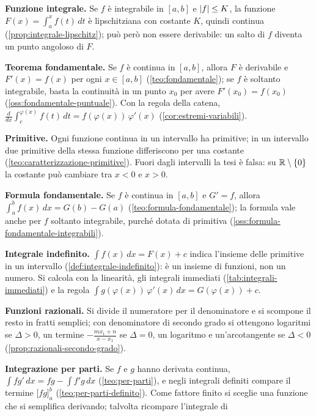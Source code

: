 \begin{puntichiave}
\item \textbf{Funzione integrale.} Se $f$ è integrabile in $[a,b]$ e $\lvert f\rvert\le K$, la
funzione $F(x)=\int_{a}^{x}f(t)\,dt$ è lipschitziana con costante $K$, quindi continua
(\cref{prop:integrale-lipschitz}); può però non essere derivabile: un salto di $f$
diventa un punto angoloso di $F$.
\item \textbf{Teorema fondamentale.} Se $f$ è continua in $[a,b]$, allora $F$ è
derivabile e $F'(x)=f(x)$ per ogni $x\in[a,b]$ (\cref{teo:fondamentale}); se $f$ è soltanto
integrabile, basta la continuità in un punto $x_{0}$ per avere $F'(x_{0})=f(x_{0})$
(\cref{oss:fondamentale-puntuale}). Con la regola della
catena, $\frac{d}{dx}\int_{c}^{\varphi(x)}f(t)\,dt=f(\varphi(x))\,\varphi'(x)$
(\cref{cor:estremi-variabili}).
\item \textbf{Primitive.} Ogni funzione continua in un intervallo ha primitive; in un
intervallo due primitive della stessa funzione differiscono per una costante
(\cref{teo:caratterizzazione-primitive}). Fuori dagli intervalli la tesi è falsa: su
$\mathbb{R}\setminus\left\{ 0 \right\}$ la costante può cambiare tra $x<0$ e $x>0$.
\item \textbf{Formula fondamentale.} Se $f$ è continua in $[a,b]$ e $G'=f$, allora
$\int_{a}^{b}f(x)\,dx=G(b)-G(a)$ (\cref{teo:formula-fondamentale}); la formula vale anche
per $f$ soltanto integrabile, purché dotata di primitiva
(\cref{oss:formula-fondamentale-integrabili}).
\item \textbf{Integrale indefinito.} $\int f(x)\,dx=F(x)+c$ indica l'insieme delle
primitive in un intervallo (\cref{def:integrale-indefinito}): è un insieme di funzioni,
non un numero. Si calcola con la linearità, gli integrali immediati
(\cref{tab:integrali-immediati}) e la regola $\int g(\varphi(x))\,\varphi'(x)\,dx
=G(\varphi(x))+c$.
\item \textbf{Funzioni razionali.} Si divide il numeratore per il denominatore e si
scompone il resto in fratti semplici; con denominatore di secondo grado si ottengono
logaritmi se $\Delta>0$, un termine $-\frac{mx_{1}+n}{x-x_{1}}$ se $\Delta=0$, un logaritmo e
un'arcotangente se $\Delta<0$ (\cref{prop:razionali-secondo-grado}).
\item \textbf{Integrazione per parti.} Se $f$ e $g$ hanno derivata continua,
$\int fg'\,dx=fg-\int f'g\,dx$ (\cref{teo:per-parti}), e negli integrali definiti compare
il termine $\bigl[fg\bigr]_{a}^{b}$ (\cref{teo:per-parti-definito}). Come fattore finito
si sceglie una funzione che si semplifica derivando; talvolta ricompare l'integrale di

\end{puntichiave}
